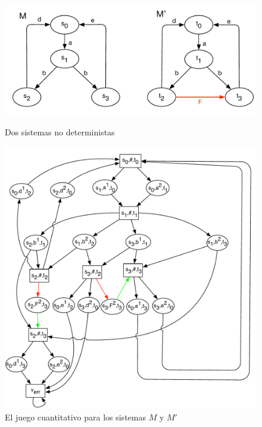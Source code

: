 \begin{figure} [h]
\begin{center}
    \includegraphics[scale=0.5]{Figs/nondeterm-eps-converted-to.pdf} 
    \caption{Dos sistemas no deterministas}
    \label{figure:nondeterm}\label{fig:two-nondet-systems}
\end{center}
\end{figure}
\begin{figure} [h]
\begin{center}
    \includegraphics[scale=0.5]{Figs/nondeterm-game-eps-converted-to.pdf} 
    \caption{El juego cuantitativo para los sistemas $M$ y $M'$}
    \label{figure:nondeterm-game}
\end{center}
\end{figure}

